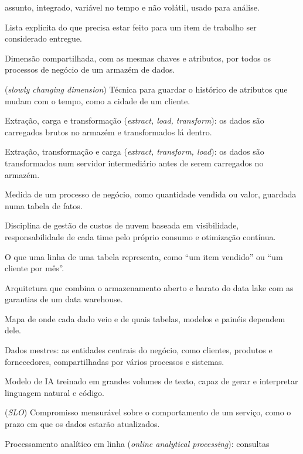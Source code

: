 \begin{description}[style=nextline, leftmargin=1.5em, font=\normalfont\scshape]
    assunto, integrado, variável no tempo e não volátil, usado para análise.
  \item[Definição de pronto] Lista explícita do que precisa estar feito para um item de trabalho
    ser considerado entregue.
  \item[Dimensão conformada] Dimensão compartilhada, com as mesmas chaves e atributos, por
    todos os processos de negócio de um armazém de dados.
  \item[Dimensão que muda devagar] (\emph{slowly changing dimension}) Técnica para guardar o
    histórico de atributos que mudam com o tempo, como a cidade de um cliente.
  \item[ELT] Extração, carga e transformação (\emph{extract, load, transform}): os dados são
    carregados brutos no armazém e transformados lá dentro.
  \item[ETL] Extração, transformação e carga (\emph{extract, transform, load}): os dados são
    transformados num servidor intermediário antes de serem carregados no armazém.
  \item[Fato] Medida de um processo de negócio, como quantidade vendida ou valor, guardada numa
    tabela de fatos.
  \item[FinOps] Disciplina de gestão de custos de nuvem baseada em visibilidade, responsabilidade
    de cada time pelo próprio consumo e otimização contínua.
  \item[Grão] O que uma linha de uma tabela representa, como \enquote{um item vendido} ou
    \enquote{um cliente por mês}.
  \item[Lakehouse] Arquitetura que combina o armazenamento aberto e barato do data lake com as
    garantias de um data warehouse.
  \item[Linhagem] Mapa de onde cada dado veio e de quais tabelas, modelos e painéis dependem dele.
  \item[Master data] Dados mestres: as entidades centrais do negócio, como clientes, produtos e
    fornecedores, compartilhadas por vários processos e sistemas.
  \item[Modelo de linguagem] Modelo de IA treinado em grandes volumes de texto, capaz de gerar e
    interpretar linguagem natural e código.
  \item[Objetivo de nível de serviço] (\emph{SLO}) Compromisso mensurável sobre o comportamento
    de um serviço, como o prazo em que os dados estarão atualizados.
  \item[OLAP] Processamento analítico em linha (\emph{online analytical processing}): consultas

\end{description}
